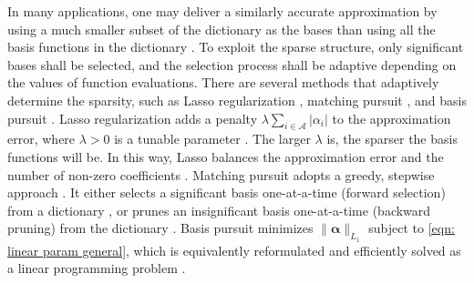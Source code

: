 In many applications, 
one may deliver a similarly accurate approximation by 
using a much smaller subset of the dictionary as the bases
than using all the basis functions in the 
dictionary \cite{PCE, L1 basis pursuit, match pursuit, Lasso variable selection}.
To exploit the sparse structure, only significant bases shall be selected, and
the selection process shall be adaptive depending on the values of function evaluations.
There are several methods that adaptively determine the sparsity, such as Lasso regularization
\cite{Lasso variable selection}, matching 
pursuit \cite{match pursuit}, and basis pursuit \cite{L1 basis pursuit}. 
Lasso regularization adds a penalty $\lambda
\sum_{i\in\mathcal{A}}|\alpha_i|$
to the approximation error, where $\lambda>0$ is a tunable parameter \cite{Lasso variable selection}. 
The larger $\lambda$ is, the sparser the basis functions will be.
In this way, Lasso balances the approximation error and the number of non-zero
coefficients \cite{Lasso variable selection}.
Matching pursuit adopts a greedy, stepwise approach \cite{match pursuit}.
It either selects a significant basis one-at-a-time (forward selection) from a dictionary
\cite{forward selection},
or prunes an insignificant basis one-at-a-time (backward pruning) from the dictionary
\cite{backward prune}. 
Basis pursuit minimizes $\|\boldsymbol{\alpha}\|_{L_1}$ subject to \eqref{eqn: linear param general},
which is equivalently reformulated and efficiently solved as a linear programming problem 
\cite{L1 basis pursuit}.\\

